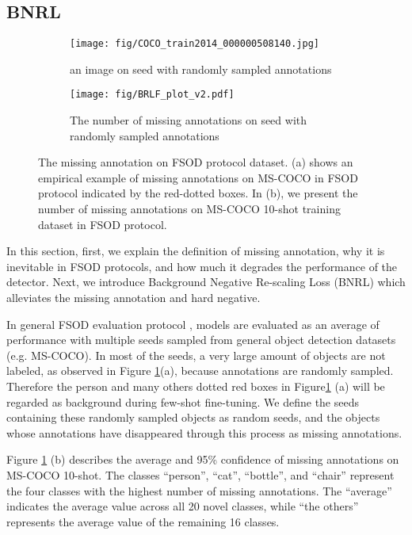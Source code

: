 \documentclass{article}
\begin{document}
\subsection{BNRL}
\begin{figure}[ht]
    \centering
    \begin{subfigure}[]{0.45\textwidth}
    \texttt{[image: fig/COCO\_train2014\_000000508140.jpg]}
    \caption{an image on seed with randomly sampled annotations}
    \end{subfigure}
    \begin{subfigure}[]{0.48\textwidth}
\texttt{[image: fig/BRLF\_plot\_v2.pdf]}
    \caption{The number of missing annotations on seed with randomly sampled annotations}
    \end{subfigure}
    \caption{
The missing annotation on FSOD protocol dataset. 
(a) shows an empirical example of missing annotations on MS-COCO in FSOD protocol indicated by the red-dotted boxes.
In (b), we present the number of missing annotations on MS-COCO 10-shot training dataset in FSOD protocol.}
    \label{fig:negative sample1}
\end{figure}
In this section, first, we explain the definition of missing annotation, why it is inevitable in FSOD protocols, and how much it degrades the performance of the detector.
Next, we introduce Background Negative Re-scaling Loss (BNRL) which alleviates the missing annotation and hard negative.

In general FSOD evaluation protocol \cite{tfa}, models are evaluated as an average of performance with multiple seeds sampled from general object detection datasets (e.g. MS-COCO).
In most of the seeds, a very large amount of objects are not labeled, as observed in Figure \ref{fig:negative sample1}(a), because annotations are randomly sampled.
Therefore the person and many others dotted red boxes in Figure\ref{fig:negative sample1} (a) will be regarded as background during few-shot fine-tuning.
We define the seeds containing these randomly sampled objects as random seeds, and the objects whose annotations have disappeared through this process as missing annotations.

Figure \ref{fig:negative sample1} (b) describes the average and 95\% confidence of missing annotations on MS-COCO 10-shot.
The classes ``person'', ``cat'', ``bottle'', and ``chair'' represent the four classes with the highest number of missing annotations. The ``average'' indicates the average value across all 20 novel classes, while ``the others'' represents the average value of the remaining 16 classes.
\end{document}
